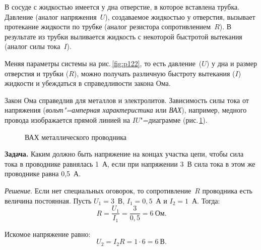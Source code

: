 \documentclass[main.tex]{subfiles}
\begin{document}
В сосуде с жидкостью имеется у дна отверстие, в которое вставлена трубка. Давление (аналог напряжения~$U$), создаваемое жидкостью у отверстия, вызывает протекание жидкости по трубке (аналог резистора сопротивлением~$R$). В результате из трубки выливается жидкость с некоторой быстротой вытекания (аналог силы тока~$I$). 

Меняя параметры системы на рис.\,\ref{fig:p122}, то есть давление~($U$) у дна и размер отверстия и трубки ($R$), можно получать различную быстроту вытекания ($I$) жидкости и убеждаться в справедливости закона Ома.


Закон Ома справедлив для металлов и электролитов. Зависимость силы тока от напряжения (\emph{вольт"=амперная характеристика} или \emph{ВАХ}), например, медного провода изображается прямой линией на $IU$"=диаграмме (рис.\,\ref{fig:p123}).  

\begin{figure}[H]
    \centering

\caption{ВАХ металлического проводника}
\label{fig:p123}
\end{figure}


\noindent\textbf{Задача.} Каким должно быть напряжение на концах участка цепи, чтобы сила тока в проводнике равнялась 1~А, если при напряжении 3~В сила тока в этом же проводнике равна 0,5~А.

\smallskip

\noindent\emph{Решение}. Если нет специальных оговорок, то сопротивление~$R$ проводника есть величина постоянная. Пусть $U_1=3$~В, $I_1=0{,}5$~А и $I_2=1$~А. Тогда:
\begin{equation*}
    R=\frac{U_1}{I_1}=\frac{3}{0{,}5}=6~\text{Ом}.
\end{equation*}

Искомое напряжение равно:
\begin{equation*}
    U_2=I_2R=1\cdot6=6~\text{В}.
\end{equation*}



 
\end{document}
